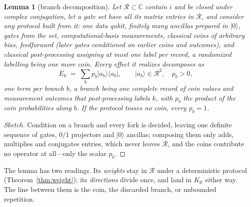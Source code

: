 \documentclass[11pt,a4paper]{article}
\newcommand{\C}{\mathbb{C}}
\newcommand{\R}{\mathbb{R}}
\newcommand{\ket}[1]{|#1\rangle}
\newcommand{\ketbra}[2]{|#1\rangle\langle#2|}
\newenvironment{sketch}{\renewcommand{\qedsymbol}{}\begin{proof}[Sketch]}{\end{proof}}
\newtheorem{lemma}[theorem]{Lemma}
\begin{document}
\begin{lemma}[branch decomposition] \label{lem:branch}
Let $\mathcal{R} \subset \C$ contain $i$ and be closed under complex conjugation, let a gate set have all its matrix entries in $\mathcal{R}$, and consider any protocol built from it: one data qubit, finitely many ancillas prepared in $\ket{0}$, gates from the set, computational-basis measurements, classical coins of arbitrary bias, feedforward (later gates conditioned on earlier coins and outcomes), and classical post-processing assigning at most one label per record, a randomized labelling being one more coin. Every effect it realizes decomposes as
\begin{equation*}
E_k \;=\; \sum_{b} p_b \ketbra{a_b}{a_b}, \qquad \ket{a_b} \in \mathcal{R}^2, \quad p_b > 0,
\end{equation*}
one term per \textit{branch} $b$, a branch being one complete record of coin values and measurement outcomes that post-processing labels $k$, with $p_b$ the product of the coin probabilities along $b$. If the protocol tosses no coin, every $p_b = 1$.
\end{lemma}

\begin{sketch}
Condition on a branch and every fork is decided, leaving one definite sequence of gates, $0/1$ projectors and $\ket{0}$ ancillas; composing them only adds, multiplies and conjugates entries, which never leaves $\mathcal{R}$, and the coins contribute no operator at all---only the scalar $p_b$.
\end{sketch}

The lemma has two readings. Its \textit{weights} stay in $\mathcal{R}$ under a deterministic protocol (Theorem~\ref{thm:weight}); its \textit{directions} divide once, and land in $K_\R$ either way. The line between them is the coin, the discarded branch, or unbounded repetition.
\end{document}

